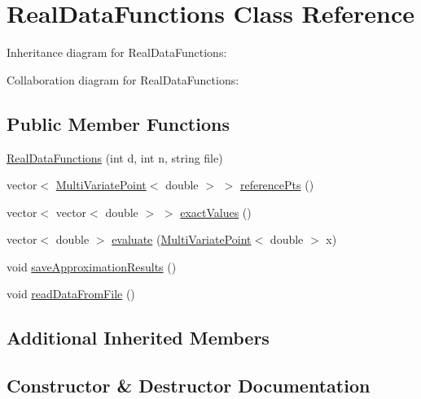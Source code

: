 \hypertarget{class_real_data_functions}{}\section{Real\+Data\+Functions Class Reference}
\label{class_real_data_functions}


Inheritance diagram for Real\+Data\+Functions\+:


Collaboration diagram for Real\+Data\+Functions\+:
\subsection*{Public Member Functions}
\begin{DoxyCompactItemize}
\item 
\hyperlink{class_real_data_functions_a8c284fd674bf306d2069e984c7ea6c13}{Real\+Data\+Functions} (int d, int n, string file)
\item 
vector$<$ \hyperlink{class_multi_variate_point}{Multi\+Variate\+Point}$<$ double $>$ $>$ \hyperlink{class_real_data_functions_a9f25dd7676fe94730988fd244b71a158}{reference\+Pts} ()
\item 
vector$<$ vector$<$ double $>$ $>$ \hyperlink{class_real_data_functions_a0ff7f83b273d83d42053a1ce366d8637}{exact\+Values} ()
\item 
vector$<$ double $>$ \hyperlink{class_real_data_functions_a359a4965873b56bea2e19287b15ae585}{evaluate} (\hyperlink{class_multi_variate_point}{Multi\+Variate\+Point}$<$ double $>$ x)
\item 
void \hyperlink{class_real_data_functions_a84d811e14eca8b9f4d752cb1b3c700d9}{save\+Approximation\+Results} ()
\item 
void \hyperlink{class_real_data_functions_a0095f9185d37621decc568db26c7926c}{read\+Data\+From\+File} ()
\end{DoxyCompactItemize}
\subsection*{Additional Inherited Members}


\subsection{Constructor \& Destructor Documentation}
